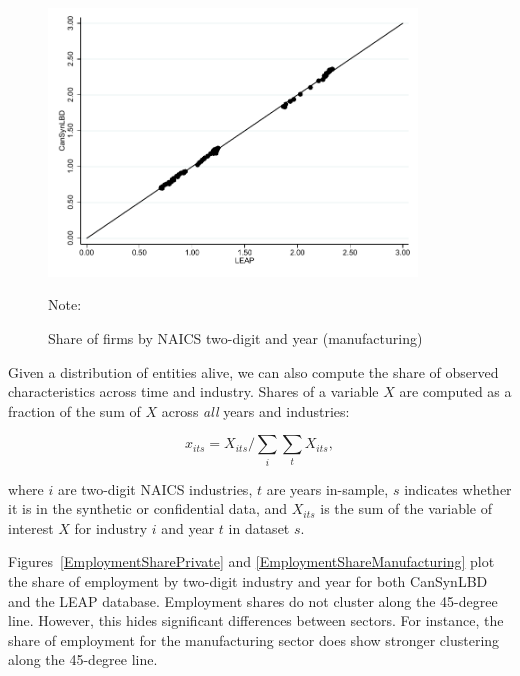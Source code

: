 \vspace{-15.5pt}
\begin{figure} [H]
\centering
\caption{Share of firms by NAICS two-digit and year (manufacturing)} \label{FirmShareManufacturing}
\includegraphics[height=2.8in, width=.7\linewidth]{graphs/Share_of_firms_by_NAICS_two-digit_and_year_Manufacturing_bw.pdf} 
\begin{minipage}{0.85\textwidth}
{\footnotesize Note: \TableNote \par}
\end{minipage}
\end{figure}

Given a distribution of entities alive, we can also compute the share of observed characteristics across time and industry. Shares of a variable $X$ are computed as a fraction of the sum of $X$ across \textit{all} years and industries:

\begin{equation}
    \label{eq:share_employment}
x_{its} = X_{its}/\sum_{i} \sum_{t} X_{its}, 

\end{equation}

where $i$ are two-digit NAICS industries, $t$ are  years in-sample, $s$ indicates whether it is in the synthetic or confidential data, and $X_{its}$ is the sum of the variable of interest $X$ for industry $i$ and year $t$ in  dataset $s$.

Figures~\ref{EmploymentSharePrivate} and \ref{EmploymentShareManufacturing} plot the share of employment by two-digit industry and year for both  CanSynLBD and the LEAP database. 
Employment shares  do not cluster along the 45-degree line. However, this hides significant differences between sectors. For instance,  the share of employment for the manufacturing sector does show stronger clustering along the 45-degree line.

